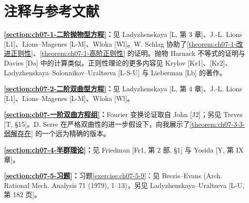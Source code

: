 \documentclass[../../main.tex]{subfiles}
\begin{document}
\section{注释与参考文献}\label{section:ch07-6-注释与参考文献}

\textbf{\cref{section:ch07-1-二阶抛物型方程}：}见 Ladyzhenskaya [L, 第 3 章]、J.-L. Lions [L1]、Lions--Magenes [L-M]、Wloka [Wl]。W. Schlag 协助了\cref{theorem:ch07-1-改进正则性}、\cref{theorem:ch07-1-高阶正则性} 的证明。抛物 Harnack 不等式的证明与 Davies [Da] 中的计算类似。正则性理论的更多内容见 Krylov [Kr1]、[Kr2]、Ladyzhenskaya--Solonnikov--Uraltseva [L-S-U] 与 Lieberman [Lb] 的著作。

\textbf{\cref{section:ch07-2-二阶双曲型方程}：}见 Ladyzhenskaya [L, 第 4 章]、J.-L. Lions [L1]、Lions--Magenes [L-M]、Wloka [Wl]。

\textbf{\cref{section:ch07-一阶双曲方程组}：}Fourier 变换论证取自 John [J2]；另见 Treves [T, \S 15]。D. Serre 在严格双曲性的进一步假设下，向我展示了\cref{theorem:ch07-3-3-弱解存在} 的一个远为精确的版本。

\textbf{\cref{section:ch07-4-半群理论}：}见 Friedman [Fr1, 第 2 部, \S 1] 与 Yosida [Y, 第 IX 章]。

\textbf{\cref{section:ch07-5-习题}：}习题\cref{exercise:ch07-5-9}：见 Brezis--Evans (Arch. Rational Mech. Analysis 71 (1979), 1--13)，另见 Ladyzhenskaya--Uraltseva [L-U, 第 182 页]。
\end{document}
